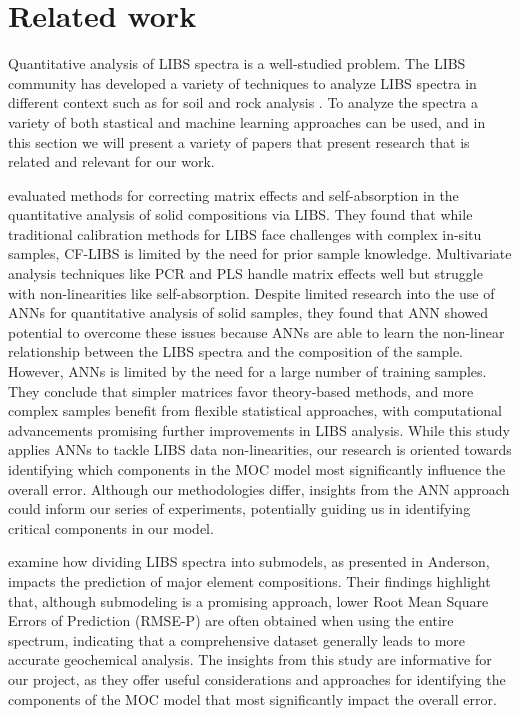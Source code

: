 \section{Related work}\label{sec:related_works}
Quantitative analysis of LIBS spectra is a well-studied problem.
The LIBS community has developed a variety of techniques to analyze LIBS spectra in different context such as for soil and rock analysis \cite{huang_progress_2023}.
To analyze the spectra a variety of both stastical and machine learning approaches can be used, and in this section we will present a variety of papers that present research that is related and relevant for our work.

\citeauthor{takahashi_quantitative_2017} evaluated methods for correcting matrix effects and self-absorption in the quantitative analysis of solid compositions via LIBS.
They found that while traditional calibration methods for LIBS face challenges with complex in-situ samples, CF-LIBS is limited by the need for prior sample knowledge.
Multivariate analysis techniques like PCR and PLS handle matrix effects well but struggle with non-linearities like self-absorption.
Despite limited research into the use of ANNs for quantitative analysis of solid samples, they found that ANN showed potential to overcome these issues because ANNs are able to learn the non-linear relationship between the LIBS spectra and the composition of the sample.
However, ANNs is limited by the need for a large number of training samples.
They conclude that simpler matrices favor theory-based methods, and more complex samples benefit from flexible statistical approaches, with computational advancements promising further improvements in LIBS analysis\cite{takahashi_quantitative_2017}.
While this study applies ANNs to tackle LIBS data non-linearities, our research is oriented towards identifying which components in the MOC model most significantly influence the overall error. Although our methodologies differ, insights from the ANN approach could inform our series of experiments, potentially guiding us in identifying critical components in our model.

\citeauthor{lepore_quantitative_2022} examine how dividing LIBS spectra into submodels, as presented in Anderson, impacts the prediction of major element compositions.
Their findings highlight that, although submodeling is a promising approach, lower Root Mean Square Errors of Prediction (RMSE-P) are often obtained when using the entire spectrum, indicating that a comprehensive dataset generally leads to more accurate geochemical analysis\cite{lepore_quantitative_2022}.
The insights from this study are informative for our project, as they offer useful considerations and approaches for identifying the components of the MOC model that most significantly impact the overall error.

